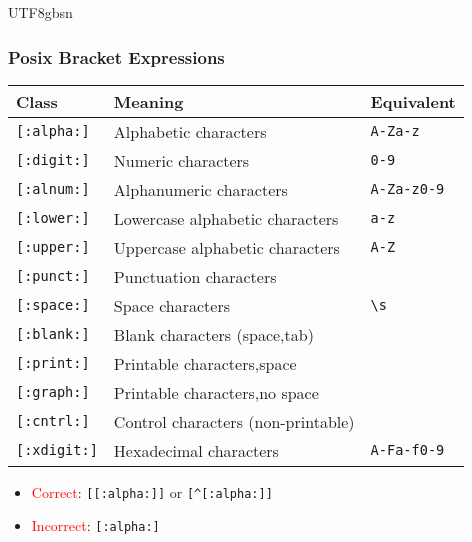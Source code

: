 \documentclass[red]{beamer}
\newcommand*{\lstverb}{\lstinline[style=caret]}
\begin{document}
\begin{CJK*}{UTF8}{gbsn}
\begin{frame}
\frametitle{Posix Bracket Expressions}
\begin{table}[ht]
\scriptsize
\renewcommand\arraystretch{1.5}
\begin{tabular}{lll}
\hline
\textbf{Class} & \textbf{Meaning} & \textbf{Equivalent}\\
\hline
\lstverb|[:alpha:]| & Alphabetic characters & \lstverb|A-Za-z|\\
\lstverb|[:digit:]| & Numeric characters & \lstverb|0-9|\\
\lstverb|[:alnum:]| & Alphanumeric characters & \lstverb|A-Za-z0-9|\\
\lstverb|[:lower:]| & Lowercase alphabetic characters & \lstverb|a-z|\\
\lstverb|[:upper:]| & Uppercase alphabetic characters & \lstverb|A-Z|\\
\lstverb|[:punct:]| & Punctuation characters & \\
\lstverb|[:space:]| & Space characters & \lstverb|\s|\\
\lstverb|[:blank:]| & Blank characters (space,tab) & \\
\lstverb|[:print:]| & Printable characters,space & \\
\lstverb|[:graph:]| & Printable characters,no space & \\
\lstverb|[:cntrl:]| & Control characters (non-printable) & \\
\lstverb|[:xdigit:]| & Hexadecimal characters & \lstverb|A-Fa-f0-9|\\
\hline
\end{tabular}
\end{table}
\begin{itemize}
\scriptsize
	\item \textcolor{red}{Correct}: \lstverb|[[:alpha:]]| or \lstverb|[^[:alpha:]]|
	\item \textcolor{red}{Incorrect}: \lstverb|[:alpha:]| 
\end{itemize}
\end{frame}



\end{CJK*}
\end{document}
